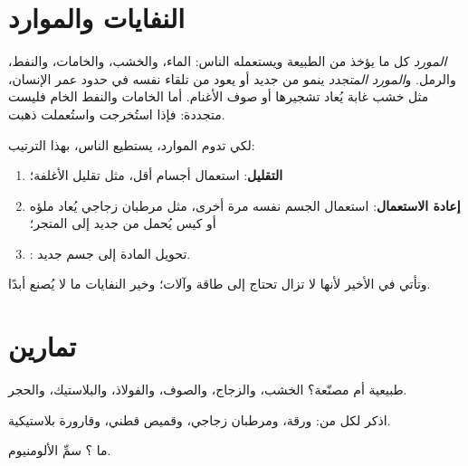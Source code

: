 \section{النفايات والموارد}

\begin{definition}[المورد]\label{def:g5:raw-materials-and-recycling:resource}
\emph{المورد} كل ما يؤخذ من الطبيعة ويستعمله الناس: الماء،
والخشب، والخامات، والنفط، والرمل. و\emph{المورد
المتجدد} ينمو من جديد أو يعود من تلقاء نفسه في
حدود عمر الإنسان، مثل خشب غابة يُعاد تشجيرها أو صوف الأغنام. أما الخامات
والنفط الخام فليست متجددة: فإذا استُخرجت واستُعملت ذهبت.
\end{definition}

\begin{proposition}\label{prop:g5:raw-materials-and-recycling:three}
لكي تدوم الموارد، يستطيع الناس، بهذا الترتيب:
\begin{enumerate}
  \item \textbf{التقليل}: استعمال أجسام أقل، مثل تقليل
        الأغلفة؛
  \item \textbf{إعادة الاستعمال}: استعمال الجسم نفسه مرة أخرى، مثل
        مرطبان زجاجي يُعاد ملؤه أو كيس يُحمل من جديد إلى المتجر؛
  \item \textbf{}: تحويل المادة إلى جسم جديد.
\end{enumerate}
وتأتي  في الأخير لأنها لا تزال تحتاج إلى طاقة وآلات؛ وخير
النفايات ما لا يُصنع أبدًا.
\end{proposition}

\section{تمارين}

\begin{exercise}[$\star$]\label{exo:g5:raw-materials-and-recycling:1}
طبيعية أم مصنّعة؟ الخشب، والزجاج، والصوف، والفولاذ، والبلاستيك، والحجر.
\end{exercise}

\begin{exercise}[$\star$]\label{exo:g5:raw-materials-and-recycling:2}
اذكر  لكل من: ورقة، ومرطبان زجاجي، وقميص قطني، وقارورة
بلاستيكية.
\end{exercise}

\begin{exercise}[$\star$]\label{exo:g5:raw-materials-and-recycling:3}
ما ؟ سمِّ  الألومنيوم.
\end{exercise}

